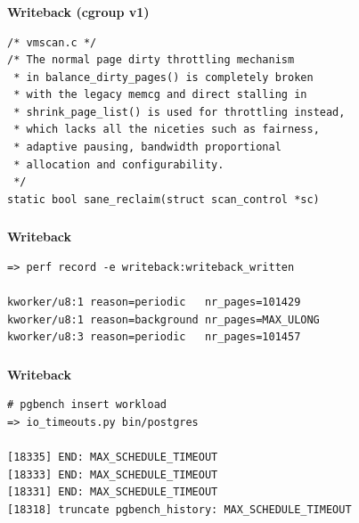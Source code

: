 \documentclass[usenames,dvipsnames, 18pt, compress, aspectratio=169]{beamer}
\begin{document}
\begin{frame}[fragile]{}
    \frametitle{}
    \begin{center}
        \textbf{Writeback (cgroup v1)}

        \begin{flushleft}
        \begin{verbatim}
/* vmscan.c */
/* The normal page dirty throttling mechanism
 * in balance_dirty_pages() is completely broken
 * with the legacy memcg and direct stalling in
 * shrink_page_list() is used for throttling instead,
 * which lacks all the niceties such as fairness,
 * adaptive pausing, bandwidth proportional
 * allocation and configurability.
 */
static bool sane_reclaim(struct scan_control *sc)
        \end{verbatim}
        \end{flushleft}

    \end{center}
\end{frame}

\begin{frame}[fragile]{}
    \frametitle{}
    \begin{center}
        \textbf{Writeback}

        \begin{flushleft}
		\begin{verbatim}
=> perf record -e writeback:writeback_written

kworker/u8:1 reason=periodic   nr_pages=101429
kworker/u8:1 reason=background nr_pages=MAX_ULONG
kworker/u8:3 reason=periodic   nr_pages=101457
        \end{verbatim}
        \end{flushleft}

    \end{center}
\end{frame}

\begin{frame}[fragile]{}
    \frametitle{}
    \begin{center}
        \textbf{Writeback}

        \begin{flushleft}
		\begin{verbatim}
# pgbench insert workload
=> io_timeouts.py bin/postgres

[18335] END: MAX_SCHEDULE_TIMEOUT
[18333] END: MAX_SCHEDULE_TIMEOUT
[18331] END: MAX_SCHEDULE_TIMEOUT
[18318] truncate pgbench_history: MAX_SCHEDULE_TIMEOUT
        \end{verbatim}
        \end{flushleft}

    \end{center}
\end{frame}
\end{document}
